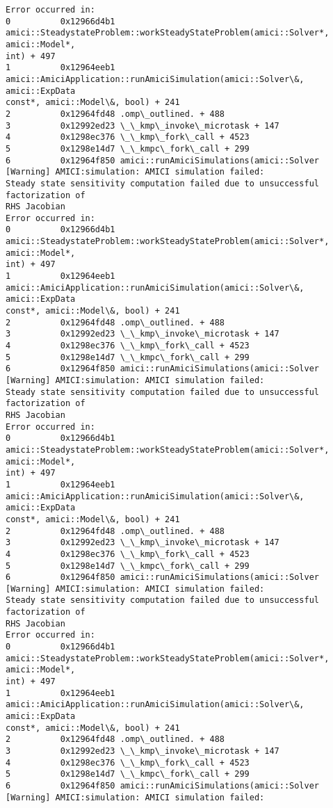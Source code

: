 \documentclass[11pt]{article}
\begin{document}
\begin{Verbatim}[commandchars=\\\{\}]
Error occurred in:
0          0x12966d4b1
amici::SteadystateProblem::workSteadyStateProblem(amici::Solver*, amici::Model*,
int) + 497
1          0x12964eeb1
amici::AmiciApplication::runAmiciSimulation(amici::Solver\&, amici::ExpData
const*, amici::Model\&, bool) + 241
2          0x12964fd48 .omp\_outlined. + 488
3          0x12992ed23 \_\_kmp\_invoke\_microtask + 147
4          0x1298ec376 \_\_kmp\_fork\_call + 4523
5          0x1298e14d7 \_\_kmpc\_fork\_call + 299
6          0x12964f850 amici::runAmiciSimulations(amici::Solver
[Warning] AMICI:simulation: AMICI simulation failed:
Steady state sensitivity computation failed due to unsuccessful factorization of
RHS Jacobian
Error occurred in:
0          0x12966d4b1
amici::SteadystateProblem::workSteadyStateProblem(amici::Solver*, amici::Model*,
int) + 497
1          0x12964eeb1
amici::AmiciApplication::runAmiciSimulation(amici::Solver\&, amici::ExpData
const*, amici::Model\&, bool) + 241
2          0x12964fd48 .omp\_outlined. + 488
3          0x12992ed23 \_\_kmp\_invoke\_microtask + 147
4          0x1298ec376 \_\_kmp\_fork\_call + 4523
5          0x1298e14d7 \_\_kmpc\_fork\_call + 299
6          0x12964f850 amici::runAmiciSimulations(amici::Solver
[Warning] AMICI:simulation: AMICI simulation failed:
Steady state sensitivity computation failed due to unsuccessful factorization of
RHS Jacobian
Error occurred in:
0          0x12966d4b1
amici::SteadystateProblem::workSteadyStateProblem(amici::Solver*, amici::Model*,
int) + 497
1          0x12964eeb1
amici::AmiciApplication::runAmiciSimulation(amici::Solver\&, amici::ExpData
const*, amici::Model\&, bool) + 241
2          0x12964fd48 .omp\_outlined. + 488
3          0x12992ed23 \_\_kmp\_invoke\_microtask + 147
4          0x1298ec376 \_\_kmp\_fork\_call + 4523
5          0x1298e14d7 \_\_kmpc\_fork\_call + 299
6          0x12964f850 amici::runAmiciSimulations(amici::Solver
[Warning] AMICI:simulation: AMICI simulation failed:
Steady state sensitivity computation failed due to unsuccessful factorization of
RHS Jacobian
Error occurred in:
0          0x12966d4b1
amici::SteadystateProblem::workSteadyStateProblem(amici::Solver*, amici::Model*,
int) + 497
1          0x12964eeb1
amici::AmiciApplication::runAmiciSimulation(amici::Solver\&, amici::ExpData
const*, amici::Model\&, bool) + 241
2          0x12964fd48 .omp\_outlined. + 488
3          0x12992ed23 \_\_kmp\_invoke\_microtask + 147
4          0x1298ec376 \_\_kmp\_fork\_call + 4523
5          0x1298e14d7 \_\_kmpc\_fork\_call + 299
6          0x12964f850 amici::runAmiciSimulations(amici::Solver
[Warning] AMICI:simulation: AMICI simulation failed:

\end{Verbatim}
\end{document}

